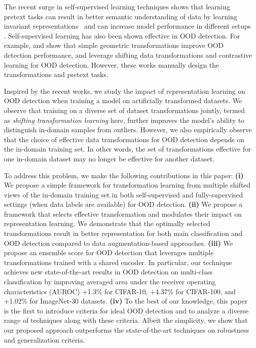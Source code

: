\documentclass[letterpaper]{article} \usepackage{aaai22}  \usepackage{times}  \usepackage{helvet}  \usepackage{courier}  \usepackage[hyphens]{url}  \usepackage{graphicx} \urlstyle{rm} \def\UrlFont{\rm}  \usepackage{natbib}  \usepackage{caption} \DeclareCaptionStyle{ruled}{labelfont=normalfont,labelsep=colon,strut=off} \frenchspacing  \setlength{\pdfpagewidth}{8.5in}  \setlength{\pdfpageheight}{11in}
\begin{document}
The recent surge in self-supervised learning techniques shows that learning pretext tasks can result in better semantic understanding of data by learning invariant representations~\cite{dosovitskiy2014discriminative} and can increase model performance in different setups \cite{gidaris2018unsupervised}.
Self-supervised learning has also been shown effective in OOD detection. For example, \citet{golan2018deep} and \citet{Hendrycks2019sv} show that simple geometric transformations improve OOD detection performance, and \citet{tack2020csi} leverage shifting data transformations and contrastive learning for OOD detection. However, these works manually design the transformations and pretext tasks. 


Inspired by the recent works, we study the impact of representation learning on OOD detection when training a model on artificially transformed datasets. We observe that training on a diverse set of dataset transformations jointly, termed as \textit{shifting transformation learning} here, further improves the model's ability to distinguish in-domain samples from outliers.
However, we also empirically observe that the choice of effective data transformations for OOD detection depends on the in-domain training set. In other words, the set of transformations effective for one in-domain dataset may no longer be effective for another dataset.



To address this problem, we make the following contributions in this paper:
\textbf{(i)} We propose a simple framework for transformation learning from multiple shifted views of the in-domain training set in both self-supervised and fully-supervised settings (when data labels are available) for OOD detection.
\textbf{(ii)} We propose a framework that selects effective transformation and modulates their impact on representation learning. We demonstrate that the optimally selected transformations result in better representation for both main classification and OOD detection compared to data augmentation-based approaches.
\textbf{(iii)} We propose an ensemble score for OOD detection that leverages multiple transformations trained with a shared encoder. In particular, our technique achieves new state-of-the-art results in OOD detection on multi-class classification by improving averaged area under the receiver operating characteristics (AUROC) +1.3\% for CIFAR-10, +4.37\% for CIFAR-100, and +1.02\% for ImageNet-30 datasets. 
\textbf{(iv)} To the best of our knowledge, this paper is the first to introduce criteria for ideal OOD detection and to analyze a diverse range of techniques along with these criteria. Albeit the simplicity, we show that our proposed approach outperforms the state-of-the-art techniques on robustness and generalization criteria. 
\end{document}
